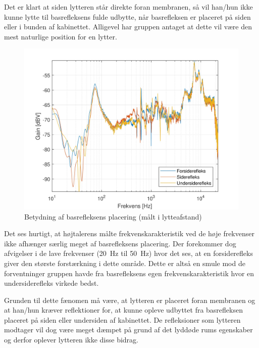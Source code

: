 Det er klart at siden lytteren står direkte foran membranen, så vil han/hun ikke kunne lytte til basrefleksens fulde udbytte, når basrefleksen er placeret på siden eller i bunden af kabinettet. Alligevel har gruppen antaget at dette vil være den mest naturlige position for en lytter.
\begin{figure}[H]
	\centering
	\vspace{-12pt}
	\includegraphics[width=\textwidth]{Billeder/Grafer/BasrefleksPlacementFar}
	\caption{Betydning af basrefleksens placering (målt i lytteafstand)}
\end{figure}

Det ses hurtigt, at højtalerens målte frekvenskarakteristik ved de høje frekvenser ikke afhænger særlig meget af basrefleksens placering. Der forekommer dog afvigelser i de lave frekvenser (\SI{20}{\hertz} til \SI{50}{\hertz}) hvor det ses, at en forsiderefleks giver den største forstærkning i dette område. Dette er altså en smule mod de forventninger gruppen havde fra basrefleksens egen frekvenskarakteristik hvor en undersiderefleks virkede bedst.

Grunden til dette fænomen må være, at lytteren er placeret foran membranen og at han/hun kræver reflektioner for, at kunne opleve udbyttet fra basrefleksen placeret på siden eller undersiden af kabinettet. De refleksioner som lytteren modtager vil dog være meget dæmpet på grund af det lyddøde rums egenskaber og derfor oplever lytteren ikke disse bidrag.